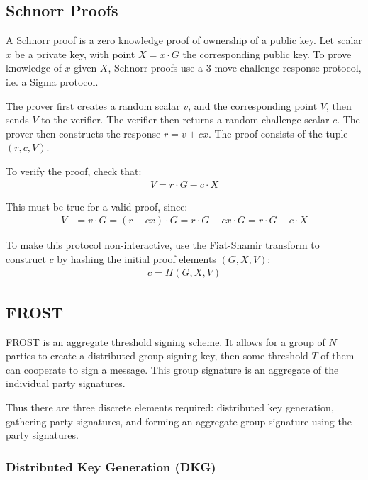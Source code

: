 \documentclass{article}
\begin{document}
\newpage
\onecolumn

\subsection{
  Schnorr Proofs
}

A Schnorr proof \cite{schnorr} is a zero knowledge proof of ownership of a public key.  Let scalar $x$ be a private key, with point $X = x \cdot G$ the corresponding public key.  To prove knowledge of $x$ given $X$, Schnorr proofs use a $3$-move challenge-response protocol, i.e. a Sigma protocol.

The prover first creates a random scalar $v$, and the corresponding point $V$, then sends $V$ to the verifier.  The verifier then returns a random challenge scalar $c$.  The prover then constructs the response $r = v + cx$.  The proof consists of the tuple $(r, c, V)$.

To verify the proof, check that:
\begin{align}
  V = r \cdot G - c \cdot X
\end{align}

This must be true for a valid proof, since:
\begin{align}
  V &= v \cdot G = (r - cx) \cdot G = r \cdot G - cx \cdot G = r \cdot G - c \cdot X\nonumber
\end{align}

To make this protocol non-interactive, use the Fiat-Shamir transform \cite{fiatshamir} to construct $c$ by hashing the initial proof elements $(G, X, V)$:
\begin{align}
  c = H(G, X, V)
\end{align}

\subsection{
  FROST
}

FROST is an aggregate threshold signing scheme.  It allows for a group of $N$ parties to create a distributed group signing key, then some threshold $T$ of them can cooperate to sign a message.  This group signature is an aggregate of the individual party signatures.

Thus there are three discrete elements required: distributed key generation, gathering party signatures, and forming an aggregate group signature using the party signatures.

\subsubsection{
  Distributed Key Generation (DKG)
}
\end{document}
